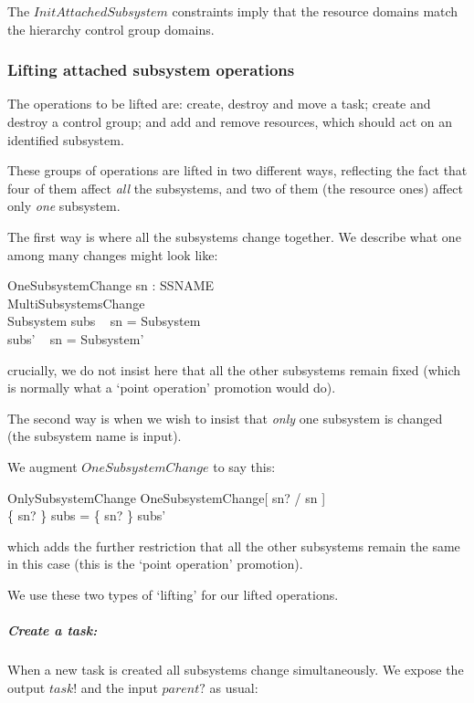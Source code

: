 \documentclass[a4paper,twoside,12pt]{article}
\begin{document}
The $InitAttachedSubsystem$ constraints imply that the resource domains match the hierarchy control group
domains.

\subsubsection{Lifting attached subsystem operations}

The operations to be lifted are: create,  destroy and move a task;
create and destroy a control group; and add and remove resources, which should act on an
identified subsystem.

These groups of operations are lifted in two different ways, reflecting the fact that four of them
affect \emph{all} the subsystems, and two of them (the resource ones) affect only \emph{one} subsystem.

The first way is where all the subsystems change together. We describe what one among many changes might look like:
\begin{schema}{OneSubsystemChange}
sn : SSNAME \\
MultiSubsystemsChange \\
\Delta Subsystem
\where
subs ~ sn = \theta Subsystem \\
subs' ~ sn = \theta Subsystem'
\end{schema}
crucially, we do not insist here that all the other subsystems remain fixed 
(which is normally what a `point operation' promotion would do).

The second way is when we wish to insist that \emph{only} one subsystem is changed (the subsystem name is input).

We augment
$OneSubsystemChange$ to say this:
\begin{schema}{OnlySubsystemChange}
OneSubsystemChange[ sn? / sn ] \\
\where
\{ sn? \} \ndres subs = \{ sn? \} \ndres subs' \\
\end{schema}
which adds the further restriction that all the other subsystems remain the same in this case (this is the `point
operation' promotion).

We use these two types of `lifting' for our lifted operations.

\subparagraph{Create a task:}

When a new task is created all subsystems change simultaneously. We expose the output $task!$ and the input $parent?$ as usual:
\end{document}

